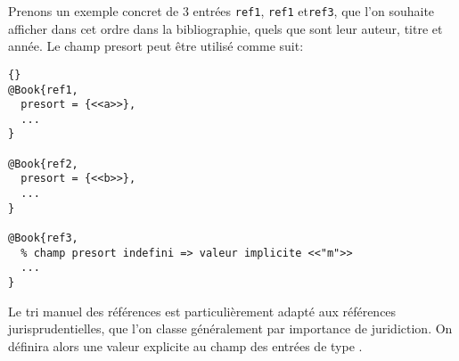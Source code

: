 \documentclass{ltxdockit}
\newcommand*{\classname}{droit-fr\xspace}
\begin{document}
Prenons un exemple concret de 3 entrées \texttt{ref1}, \texttt{ref1} et\texttt{ref3}, que l'on souhaite afficher dans cet ordre dans la bibliographie, quels que sont leur auteur, titre et année. Le champ presort peut être utilisé comme suit:

\begin{lstlisting}[style=bibtex]{}
@Book{ref1,
  presort = {<<a>>},
  ...
}

@Book{ref2,
  presort = {<<b>>},
  ...
}

@Book{ref3,
  % champ presort indefini => valeur implicite <<"m">>
  ...
}
\end{lstlisting}
%

Le tri manuel des références est particulièrement adapté aux références jurisprudentielles, que l'on classe généralement par importance de juridiction. On définira alors une valeur explicite au champ  des entrées de type .





%
%
%
%
%
%
%
%
%
%
\end{document}
